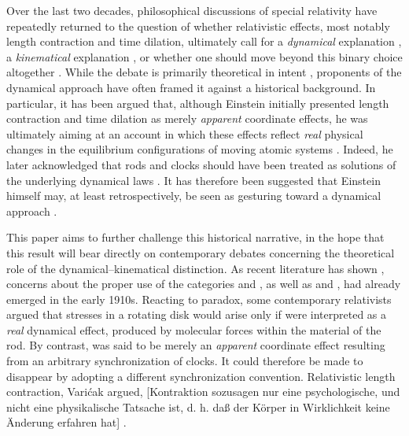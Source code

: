 \documentclass[submitted,12pt]{article}
\begin{document}
Over the last two decades, philosophical discussions of special relativity have repeatedly returned to the question of whether relativistic effects, most notably length contraction and time dilation, ultimately call for a \emph{dynamical} explanation , a \emph{kinematical} explanation , or whether one should move beyond this binary choice altogether \citep{Acuna2016}. While the debate is primarily theoretical in intent , proponents of the dynamical approach have often framed it against a historical background. In particular, it has been argued that, although Einstein initially presented length contraction and time dilation as merely \emph{apparent} coordinate effects, he was ultimately aiming at an account in which these effects reflect \emph{real} physical changes in the equilibrium configurations of moving atomic systems \citep{Brown2022}. Indeed, he later acknowledged that rods and clocks should have been treated as solutions of the underlying dynamical laws \citep[61]{Einstein1949}. It has therefore been suggested that Einstein himself may, at least retrospectively, be seen as gesturing toward a dynamical approach \citep[70]{Brown2022}. 



This paper aims to further challenge this historical narrative, in the hope that this result will bear directly on contemporary debates concerning the theoretical role of the dynamical--kinematical distinction. As recent literature has shown \citep{Giovanelli2023a}, concerns about the proper use of the categories  and , as well as  and , had already emerged in the early 1910s. Reacting to  paradox, some contemporary relativists  argued that stresses in a rotating disk would arise only if  were interpreted as a \emph{real} dynamical effect, produced by molecular forces within the material of the rod. By contrast,  was said to be merely an \emph{apparent} coordinate effect resulting from an arbitrary synchronization of clocks. It could therefore be made to disappear by adopting a different synchronization convention. Relativistic length contraction, Varićak argued, [Kontraktion sozusagen nur eine psychologische, und nicht eine physikalische Tatsache ist, d. h. daß der Körper in Wirklichkeit keine Änderung erfahren hat] \citep[169]{Varicak1911}.
\end{document}
